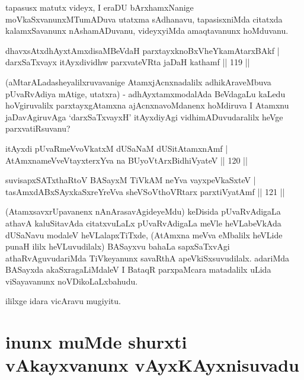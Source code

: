 \begin{artha}
tapasusx matutx videyx, I eraDU bArxhamxNanige moVkaSxvanunxMTumADuva utatxma sAdhanavu, tapasisxniMda citatxda kalamxSavanunx nAshamADuvanu, videyxyiMda amaqtavanunx hoMduvanu.
\end{artha}

\begin{shl}
dhavxsAtxdhAyxtAmxdisaMBeVdaH parxtayxknoBxVheYkamAtarxBAkf |\\
darxSaTxvayx itAyxdividhw parxvateVRta jaDaH kathamf \hfill || 119 ||
\end{shl}

\begin{artha}
(aMtarALadasheyalilxruvavanige AtamxjAcnxnadalilx adhikAraveMbuva pUvaR\-\break vAdiya mAtige, utatxra) - adhAyxtamxmodalAda BeVdagaLu kaLedu hoVgiruvalilx parxtayxgAtamxna ajAcnxnavoMdanenx hoMdiruva I Atamxnu jaDavAgiruvAga `darxSaTxvayxH' itAyxdiyAgi vidhimADuvudaralilx heVge parxvatiRsuvanu?
\end{artha}


\begin{shl}
itAyxdi pUvaRmeVvoVkatxM dUSaNaM dUSitAtamxnAmf |\\
AtAmxnameVveVtayxterxYva na BUyoV\s tArxBidhiVyateV \hfill || 120 ||
\end{shl}

\begin{shl}
suvisapxSATxthaRtoV BASayxM TiVkAM neYva vayxpeVkaSxteV |\\
tasAmxdABxSAyxkaSxreYreVva sheVSoV\s thoVR\s tarx parxtiVyatAmf \hfill || 121 ||
\end{shl}

\begin{artha}
(AtamxsavxrUpavanenx nAnArasavAgideyeMdu) keDisida pUvaRvAdigaLa athavA kaluSitavAda citatxvuLaLx pUvaRvAdigaLa meVle heVLabeVkAda dUSaNavu modaleV heVLalapxTiTxde, (AtAmxna meVva eMbalilx heVLide punaH ililx heVLuvudilalx) BASayxvu bahaLa sapxSaTxvAgi athaRvAguvudariMda TiVkeyanunx savaRthA apeVkiSxsuvudilalx. adariMda BASayxda akaSxragaLiMdaleV I BataqR parxpaMcara matadalilx uLida viSayavanunx noVDikoLaLxbahudu.
\end{artha}
	
\begin{center}
ililxge idara vicAravu mugiyitu.
\end{center}

\section*{inunx muMde shurxti vAkayxvanunx vAyxKAyxnisuvadu}


